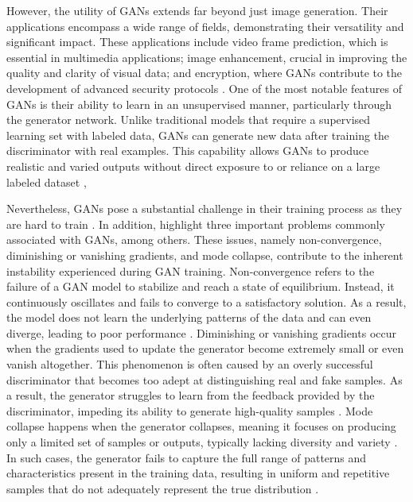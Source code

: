 However, the utility of GANs extends far beyond just image generation. Their applications encompass a wide range of fields, demonstrating their versatility and significant impact. These applications include video frame prediction, which is essential in multimedia applications; image enhancement, crucial in improving the quality and clarity of visual data; and encryption, where GANs contribute to the development of advanced security protocols \citep{goodfellowGAN}. One of the most notable features of GANs is their ability to learn in an unsupervised manner, particularly through the generator network. Unlike traditional models that require a supervised learning set with labeled data, GANs can generate new data after training the discriminator with real examples. This capability allows GANs to produce realistic and varied outputs without direct exposure to or reliance on a large labeled dataset \citep{GoodfellowDeepLearning},


Nevertheless, GANs pose a substantial challenge in their training process as they are hard to train \citep{goodfellowGAN}. In addition, \citeauthor{brophyGAN} highlight three important problems commonly associated with GANs, among others. These issues, namely non-convergence, diminishing or vanishing gradients, and mode collapse, contribute to the inherent instability experienced during GAN training. Non-convergence refers to the failure of a GAN model to stabilize and reach a state of equilibrium. Instead, it continuously oscillates and fails to converge to a satisfactory solution. As a result, the model does not learn the underlying patterns of the data and can even diverge, leading to poor performance \citep{brophyGAN}. Diminishing or vanishing gradients occur when the gradients used to update the generator become extremely small or even vanish altogether. This phenomenon is often caused by an overly successful discriminator that becomes too adept at distinguishing real and fake samples. As a result, the generator struggles to learn from the feedback provided by the discriminator, impeding its ability to generate high-quality samples \citep{brophyGAN}. Mode collapse happens when the generator collapses, meaning it focuses on producing only a limited set of samples or outputs, typically lacking diversity and variety \citep{salimansNIPS}. In such cases, the generator fails to capture the full range of patterns and characteristics present in the training data, resulting in uniform and repetitive samples that do not adequately represent the true distribution \citep{brophyGAN}.
